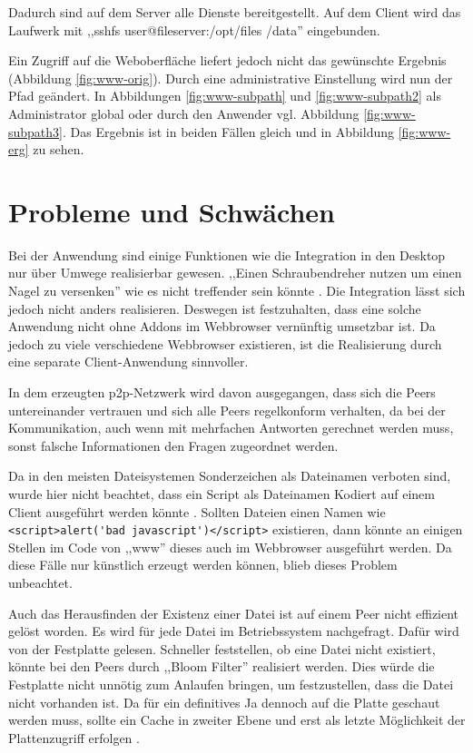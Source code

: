 \documentclass[oneside, ngerman, toc=bibliography,bibliography=totoc,listof=entryprefix, open=right,numbers=noenddot,fontsize=12pt]{scrbook}
\begin{document}
Dadurch sind auf dem Server alle Dienste bereitgestellt. Auf dem Client wird das Laufwerk mit ,,sshfs user@fileserver:/opt/files /data'' eingebunden.

Ein Zugriff auf die Weboberfläche liefert jedoch nicht das gewünschte Ergebnis (Abbildung \ref{fig:www-orig}). Durch eine administrative Einstellung wird nun der Pfad geändert. In Abbildungen \ref{fig:www-subpath} und \ref{fig:www-subpath2} als Administrator global oder durch den Anwender vgl. Abbildung \ref{fig:www-subpath3}. Das Ergebnis ist in beiden Fällen gleich und in Abbildung \ref{fig:www-erg} zu sehen.



\section{Probleme und Schwächen}

Bei der Anwendung sind einige Funktionen wie die Integration in den Desktop nur über Umwege realisierbar gewesen.
,,Einen Schraubendreher nutzen um einen Nagel zu versenken'' wie es nicht treffender sein könnte \cite{cederholm2009web}. Die Integration lässt sich jedoch nicht anders realisieren. Deswegen ist festzuhalten, dass eine solche Anwendung nicht ohne Addons im Webbrowser vernünftig umsetzbar ist. Da jedoch zu viele verschiedene Webbrowser existieren, ist die Realisierung durch eine separate Client-Anwendung sinnvoller.

In dem erzeugten \acrshort{p2p}-Netzwerk wird davon ausgegangen, dass sich die Peers untereinander vertrauen und sich alle Peers regelkonform verhalten, da bei der Kommunikation, auch wenn mit mehrfachen Antworten gerechnet werden muss, sonst falsche Informationen den Fragen zugeordnet werden.

Da in den meisten Dateisystemen Sonderzeichen als Dateinamen verboten sind, wurde hier nicht beachtet, dass ein Script als Dateinamen Kodiert auf einem Client ausgeführt werden könnte \cite{winforbit}. Sollten Dateien einen Namen wie \verb|<script>alert('bad javascript')</script>| existieren, dann könnte an einigen Stellen im Code von ,,www'' dieses auch im Webbrowser ausgeführt werden. Da diese Fälle nur künstlich erzeugt werden können, blieb dieses Problem unbeachtet.

Auch das Herausfinden der Existenz einer Datei ist auf einem Peer nicht effizient gelöst worden.
Es wird für jede Datei im Betriebssystem nachgefragt. Dafür wird von der Festplatte gelesen.
Schneller feststellen, ob eine Datei nicht existiert, könnte bei den Peers durch ,,Bloom Filter'' realisiert werden. Dies würde die Festplatte nicht unnötig  zum Anlaufen bringen, um festzustellen, dass die Datei nicht vorhanden ist. Da für ein definitives Ja dennoch auf die Platte geschaut werden muss, sollte ein Cache in zweiter Ebene und erst als letzte Möglichkeit der Plattenzugriff erfolgen \cite{bejeck2013getting}.  
\end{document}
